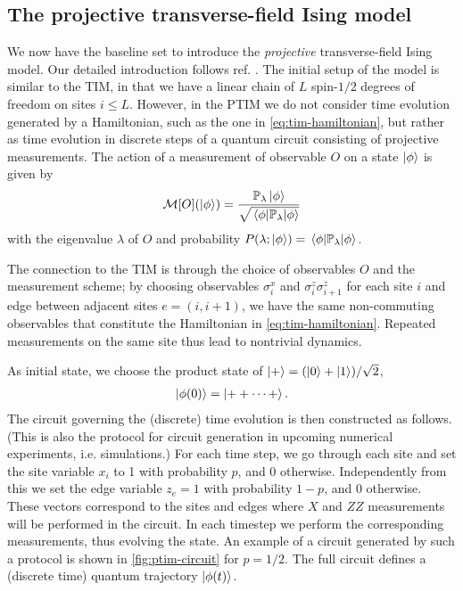 \subsection{The projective transverse-field Ising model}\label{sec:the-ptim}
We now have the baseline set to introduce the \emph{projective}
transverse-field Ising model. Our detailed introduction follows ref.
\cite{langEntanglementTransitionProjective2020}. 
The initial setup of the model is similar to the
TIM, in that we have a linear chain of $L$ spin-$1 /2$ degrees of freedom on sites
$i\leq L$. However, in the PTIM we do not consider time evolution generated by
a Hamiltonian, such as the one in \cref{eq:tim-hamiltonian}, but rather as time
evolution in discrete steps of a quantum circuit consisting of projective
measurements. The action of a measurement of observable $O$ on a state
$\ket{\phi}$ is given by
\begin{align}
  \mathcal{M}[O](\ket{\phi}) =
  \frac{\mathbb{P}_\lambda\ket{\phi}}{\sqrt{\expval{\mathbb{P}_\lambda}{\phi}}}
\end{align}
with the eigenvalue $\lambda$ of $O$ and probability $P(\lambda;
\ket{\phi}) = \expval{\mathbb{P}_\lambda}{\phi}$.

The connection to the TIM is through the choice of observables $O$ and the
measurement scheme; by choosing
observables $\sigma^x_i$ and $\sigma_i^z\sigma_{i+1}^z$ for each site $i$ and
edge between adjacent sites $e=(i,i+1)$, we have the same non-commuting observables that
constitute the Hamiltonian in \cref{eq:tim-hamiltonian}. Repeated measurements
on the same site thus lead to nontrivial dynamics.

As initial state, we choose the product state of $\ket{+} = (\ket{0} + \ket{1})
/ \sqrt{2}$,
\begin{align}
  \ket{\phi(0)} = \ket{++\cdots +}
.\end{align}
The circuit governing the (discrete) time evolution is then constructed as
follows. (This is also the protocol for circuit generation in upcoming numerical
experiments, i.e. simulations.) For each time step, we go through each site and
set the site variable $x_i$ to 1 with probability $p$, and 0 otherwise.
Independently from this we set the edge variable $z_e=1$ with probability
$1-p$, and 0 otherwise. These vectors correspond to the sites and edges where
$X$ and $ZZ$ measurements will be performed in the circuit. In each timestep we
perform the corresponding measurements, thus evolving the state. An example of
a circuit generated by such a protocol is shown in \cref{fig:ptim-circuit} for
$p=1 /2$. The full circuit defines a (discrete time) quantum trajectory
$\ket{\phi(t)}$.

